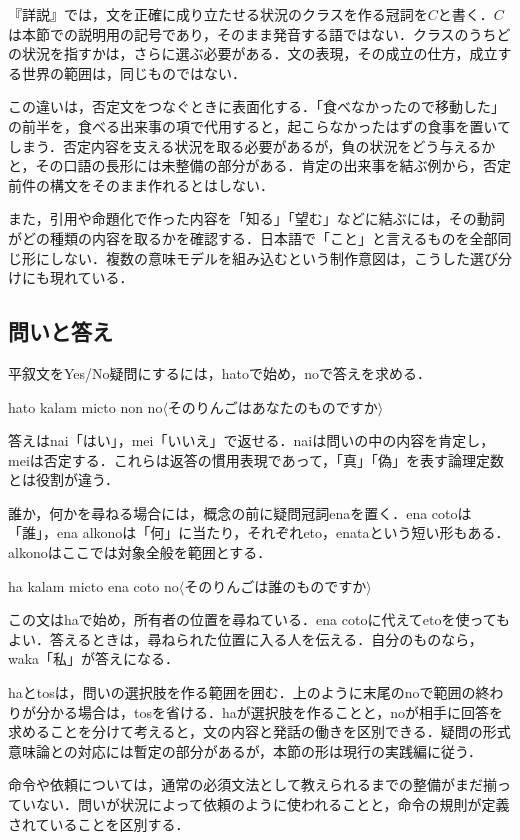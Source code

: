 \documentclass[b5paper, 10pt]{ltjsarticle}
\newcommand{\ko}[1]{\textsf{#1}}
\newcommand{\sentence}[1]{$\langle$#1$\rangle$}
\begin{document}
『詳説』では，文を正確に成り立たせる状況のクラスを作る冠詞を$C$と書く．$C$は本節での説明用の記号であり，そのまま発音する語ではない．クラスのうちどの状況を指すかは，さらに選ぶ必要がある．文の表現，その成立の仕方，成立する世界の範囲は，同じものではない．

この違いは，否定文をつなぐときに表面化する．「食べなかったので移動した」の前半を，食べる出来事の項で代用すると，起こらなかったはずの食事を置いてしまう．否定内容を支える状況を取る必要があるが，負の状況をどう与えるかと，その口語の長形には未整備の部分がある．肯定の出来事を結ぶ例から，否定前件の構文をそのまま作れるとはしない．

また，引用や命題化で作った内容を「知る」「望む」などに結ぶには，その動詞がどの種類の内容を取るかを確認する．日本語で「こと」と言えるものを全部同じ形にしない．複数の意味モデルを組み込むという制作意図は，こうした選び分けにも現れている．

\subsection{問いと答え}
平叙文をYes/No疑問にするには，\ko{hato}で始め，\ko{no}で答えを求める．
\begin{exe}
    \ex \ko{hato kalam micto non no}\hfill \sentence{そのりんごはあなたのものですか}
\end{exe}
答えは\ko{nai}「はい」，\ko{mei}「いいえ」で返せる．\ko{nai}は問いの中の内容を肯定し，\ko{mei}は否定する．これらは返答の慣用表現であって，「真」「偽」を表す論理定数とは役割が違う．

誰か，何かを尋ねる場合には，概念の前に疑問冠詞\ko{ena}を置く．\ko{ena coto}は「誰」，\ko{ena alkono}は「何」に当たり，それぞれ\ko{eto}，\ko{enata}という短い形もある．\ko{alkono}はここでは対象全般を範囲とする．
\begin{exe}
    \ex \ko{ha kalam micto ena coto no}\hfill \sentence{そのりんごは誰のものですか}
\end{exe}
この文は\ko{ha}で始め，所有者の位置を尋ねている．\ko{ena coto}に代えて\ko{eto}を使ってもよい．答えるときは，尋ねられた位置に入る人を伝える．自分のものなら，\ko{waka}「私」が答えになる．

\ko{ha}と\ko{tos}は，問いの選択肢を作る範囲を囲む．上のように末尾の\ko{no}で範囲の終わりが分かる場合は，\ko{tos}を省ける．\ko{ha}が選択肢を作ることと，\ko{no}が相手に回答を求めることを分けて考えると，文の内容と発話の働きを区別できる．疑問の形式意味論との対応には暫定の部分があるが，本節の形は現行の実践編に従う．

命令や依頼については，通常の必須文法として教えられるまでの整備がまだ揃っていない．問いが状況によって依頼のように使われることと，命令の規則が定義されていることを区別する．
\end{document}
